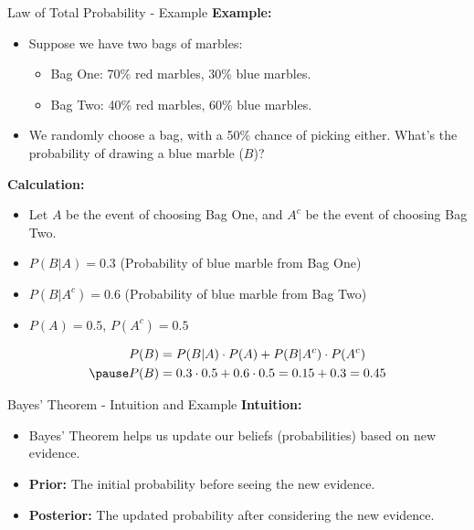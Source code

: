 \documentclass[handout]{beamer} %
\begin{document}
\begin{frame}{Law of Total Probability - Example}
    \textbf{Example:}\pause
    \begin{itemize}
        \item Suppose we have two bags of marbles:\pause
        \begin{itemize}
            \item Bag One: 70\% red marbles, 30\% blue marbles.\pause
            \item Bag Two: 40\% red marbles, 60\% blue marbles.\pause
        \end{itemize}
        \item We randomly choose a bag, with a 50\% chance of picking either. What's the probability of drawing a blue marble ($B$)?
    \end{itemize}\pause

    \textbf{Calculation:}\pause
    \begin{itemize}
        \item Let \(A\) be the event of choosing Bag One, and \(A^c\) be the event of choosing Bag Two.\pause
        \item \(P(B|A) = 0.3\) (Probability of blue marble from Bag One)\pause
        \item \(P(B|A^c) = 0.6\) (Probability of blue marble from Bag Two)\pause
        \item \(P(A) = 0.5\), \(P(A^c) = 0.5\)         \pause
    \end{itemize}
    \begin{align*}
        P(B) &= P(B|A) \cdot P(A) + P(B|A^c) \cdot P(A^c) \\ \pause
        P(B) &= 0.3 \cdot 0.5 + 0.6 \cdot 0.5 = 0.15 + 0.3 = 0.45
    \end{align*}
\end{frame}



\begin{frame}{Bayes' Theorem - Intuition and Example}
    \textbf{Intuition:}\pause
    \begin{itemize}
        \item Bayes' Theorem helps us update our beliefs (probabilities) based on new evidence.\pause
        \item \textbf{Prior:} The initial probability before seeing the new evidence.\pause
        \item \textbf{Posterior:} The updated probability after considering the new evidence.
    \end{itemize}
\end{frame}
\end{document}
